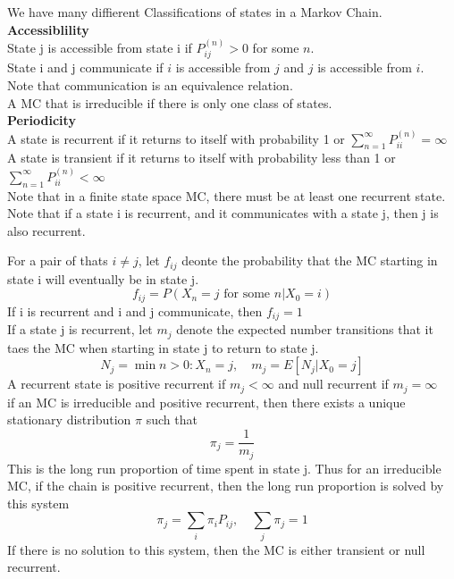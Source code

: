 \documentclass[answers,12pt,addpoints]{exam}
\begin{document}
\begin{definition}
    We have many diffierent Classifications of states in a Markov Chain.\\
    \textbf{Accessiblility}\\
    State j is accessible from state i if $P_{ij}^{(n)} > 0$ for some $n$.\\
    State i and j communicate if $i$ is accessible from $j$ and $j$ is accessible from $i$.\\
    Note that communication is an equivalence relation.\\
    A MC that is irreducible if there is only one class of states.\\
    \textbf{Periodicity}\\
    A state is recurrent if it returns to itself with probability 1 or $\sum_{n=1}^{\infty} P_{ii}^{(n)} = \infty$\\
    A state is transient if it returns to itself with probability less than 1 or $\sum_{n=1}^{\infty} P_{ii}^{(n)} < \infty$\\
    Note that in a finite state space MC, there must be at least one recurrent state.\\
    Note that if a state i is recurrent, and it communicates with a state j, then j is also recurrent.
\end{definition}
\begin{definition}
    For a pair of thats $i \neq j$, let $f_{ij}$ deonte the probability that the MC starting in state i will eventually be in state j.\\
    $$f_{ij} = P(X_n = j \text{ for some } n | X_0 = i)$$
    If i is recurrent and i and j communicate, then $f_{ij} = 1$\\
    If a state j is recurrent, let $m_j$ denote the expected number transitions that it taes the MC when starting in state j to return to state j.
    $$N_j = \min{n >0: X_n = j}, \quad m_j = E[N_j|X_0 = j]$$
    A recurrent state is positive recurrent if $m_j < \infty$ and null recurrent if $m_j = \infty$\\
    if an MC is irreducible and positive recurrent, then there exists a unique stationary distribution $\pi$ such that
    $$\pi_j = \frac{1}{m_j} $$
    This is the long run proportion of time spent in state j. Thus  for an irreducible MC, if the chain is positive recurrent, then the long run proportion is solved by this system
    $$ \pi_j = \sum_{i} \pi_i P_{ij}, \quad \sum_j \pi_j = 1$$
    If there is no solution to this system, then the MC is either transient or null recurrent.
\end{definition}
\end{document}
